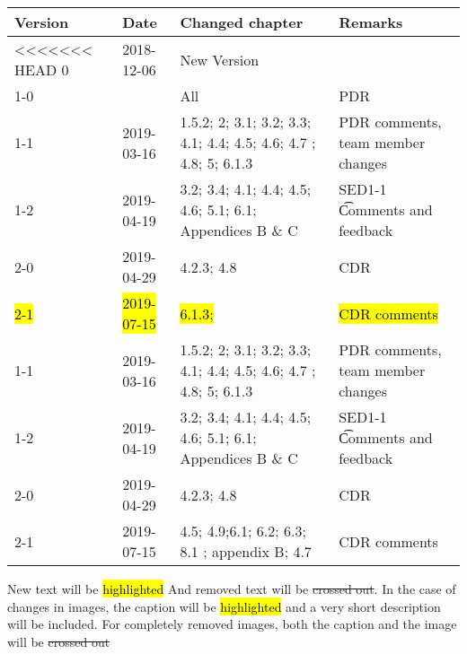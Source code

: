 \begin{longtable}{|p{1.5cm}|p{2cm}|p{6cm}|p{3cm}|}\hline
\centering
\textbf{Version} & \textbf{Date} & \textbf{Changed chapter} & \textbf{Remarks}  \\\hline
<<<<<<< HEAD
0       & 2018-12-06        & New Version                                                           &                                       \\\hline
1-0     &                   & All                                                                   & PDR                                   \\\hline
1-1     & 2019-03-16        & 1.5.2; 2; 3.1; 3.2; 3.3; 4.1; 4.4; 4.5; 4.6; 4.7 ; 4.8; 5; 6.1.3      & PDR comments, team member changes     \\\hline
1-2     & 2019-04-19        & 3.2; 3.4; 4.1; 4.4; 4.5; 4.6; 5.1; 6.1; Appendices B \& C             & SED1-1 \t Comments and feedback       \\\hline
2-0     & 2019-04-29        & 4.2.3; 4.8                                                            & CDR                                   \\\hline
\hl{2-1}& \hl{2019-07-15}   & \hl{6.1.3; }                                                          & \hl{CDR comments}                     \\\hline

1-1		& 2019-03-16	& 1.5.2; 2; 3.1; 3.2; 3.3; 4.1; 4.4; 4.5; 4.6; 4.7 ; 4.8; 5; 6.1.3		& PDR comments, team member changes 			\\\hline
1-2		& 2019-04-19 	& 3.2; 3.4; 4.1; 4.4; 4.5; 4.6; 5.1; 6.1; Appendices B \& C 			& SED1-1 \t Comments and feedback \\\hline
2-0 & 2019-04-29 & 4.2.3; 4.8													& CDR \\\hline
2-1 & 2019-07-15 & 4.5; 4.9;6.1; 6.2; 6.3; 8.1 ; appendix B; 4.7												& CDR comments \\\hline
\end{longtable}       

New text will be \hl{highlighted} And removed text will be \st{crossed out}. In the case of changes in images, the caption will be \hl{highlighted} and a very short description will be included. For completely removed images, both the caption and the image will be \st{crossed out} 
